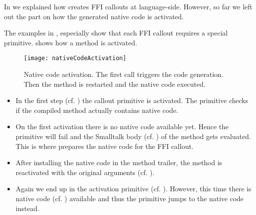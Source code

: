 
In  we explained how \NB creates FFI callouts at language-side.
However, so far we left out the part on how the generated native code is activated.

The examples in , especially  show that each \NB FFI callout requires a special primitive.
 shows how a \NB method is activated.


\begin{figure}[h]
	\centering
	\texttt{[image: nativeCodeActivation]}
	\caption{Native code activation. The first call triggers the code generation. Then the method is restarted and the native code executed.}
\end{figure}

\begin{itemize}
\item In the first step (cf. ) the \NB callout primitive is activated.
	The primitive checks if the compiled method actually contains native code.
\item On the first activation there is no native code available yet.
	Hence the primitive will fail and the Smalltalk body (cf. ) of the \NB method gets evaluated.
	This is where \NB prepares the native code for the FFI callout.
\item After installing the native code in the method trailer, the \NB method is reactivated with the original arguments (cf. ).
\item Again we end up in the \NB activation primitive (cf. ).
	However, this time there is native code (cf. ) available and thus the primitive jumps to the native code instead.
\end{itemize}




